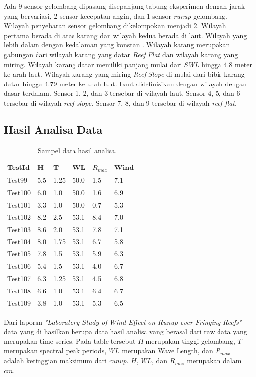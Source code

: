 Ada 9 sensor gelombang dipasang disepanjang tabung eksperimen dengan jarak yang bervariasi, 2 sensor kecepatan angin, dan 1 sensor \emph{runup} gelombang. Wilayah penyebaran sensor gelombang dikelompokan menjadi 2. Wilayah pertama berada di atas karang dan wilayah kedua berada di laut. Wilayah yang lebih dalam dengan kedalaman yang konstan \cite{DemirbilekReport}. Wilayah karang merupakan gabungan dari wilayah karang yang datar \emph{Reef Flat} dan wilayah karang yang miring. Wilayah karang datar memiliki panjang mulai dari \emph{SWL} hingga 4.8 meter ke arah laut. Wilayah karang yang miring \emph{Reef Slope} di mulai dari bibir karang datar hingga 4.79 meter ke arah laut. Laut didefinisikan dengan wilayah dengan dasar terdalam. Sensor 1, 2, dan 3 tersebar di wilayah laut. Sensor 4, 5, dan 6 tersebar di wilayah \emph{reef slope}. Sensor 7, 8, dan 9 tersebar di wilayah \emph{reef flat}.

\subsection{Hasil Analisa Data}
    \begin{table}
    \begin{center}
      \begin{tabular}{|l|l|l|l|l|l|l|l|}
      \hline
      TestId & H & T & WL & $R_{max}$ & Wind \\ \hline
      Test99 & 5.5 & 1.25 & 50.0 & 1.5 & 7.1 \\ \hline
      Test100 & 6.0 & 1.0 & 50.0 & 1.6 & 6.9 \\ \hline
      Test101 & 3.3 & 1.0 & 50.0 & 0.7 & 5.3 \\ \hline
      Test102 & 8.2 & 2.5 & 53.1 & 8.4 & 7.0 \\ \hline
      Test103 & 8.6 & 2.0 & 53.1 & 7.8 & 7.1 \\ \hline
      Test104 & 8.0 & 1.75 & 53.1 & 6.7 & 5.8 \\ \hline
      Test105 & 7.8 & 1.5 & 53.1 & 5.9 & 6.3 \\ \hline
      Test106 & 5.4 & 1.5 & 53.1 & 4.0 & 6.7 \\ \hline
      Test107 & 6.3 & 1.25 & 53.1 & 4.5 & 6.8 \\ \hline
      Test108 & 6.6 & 1.0 & 53.1 & 6.4 & 6.7 \\ \hline
      Test109 & 3.8 & 1.0 & 53.1 & 5.3 & 6.5 \\ \hline
      \end{tabular}
      \end{center}
    \caption{Sampel data hasil analisa.}
    \end{table}
  \FloatBarrier
  Dari laporan \emph{"Laboratory Study of Wind Effect on Runup over Fringing Reefs"} \cite{DemirbilekReport} data yang di hasilkan berupa data hasil analisa yang berasal dari raw data yang merupakan time series. Pada table tersebut $H$ merupakan tinggi gelombang, $T$ merupakan spectral peak periods, $WL$ merupakan Wave Length, dan $R_{max}$ adalah ketinggian maksimum dari \emph{runup}. $H$, $WL$, dan $R_{max}$ merupakan dalam $cm$.

